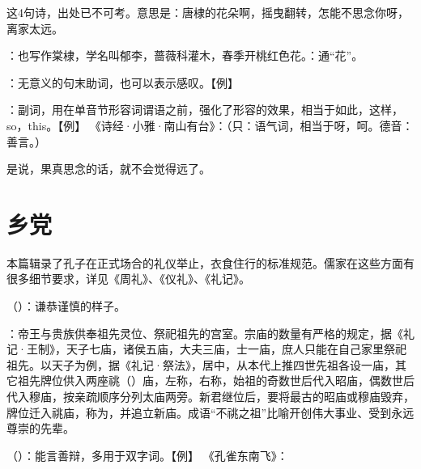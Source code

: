 {
\item {}这4句诗，出处已不可考。意思是：唐棣的花朵啊，摇曳翻转，怎能不思念你呀，离家太远。

：也写作棠棣，学名叫郁李，蔷薇科灌木，春季开桃红色花。：通“花”。

：无意义的句末助词，也可以表示感叹。【例】 

：副词，用在单音节形容词谓语之前，强化了形容的效果，相当于如此，这样，so，this。【例】 《诗经·小雅·南山有台》：（只：语气词，相当于呀，呵。德音：善言。）

\item {}是说，果真思念的话，就不会觉得远了。
}
{}



\chapter{乡党}

本篇辑录了孔子在正式场合的礼仪举止，衣食住行的标准规范。儒家在这些方面有很多细节要求，详见《周礼》、《仪礼》、《礼记》。%

\bigskip

{
\item {}（）：谦恭谨慎的样子。
\item {}：帝王与贵族供奉祖先灵位、祭祀祖先的宫室。宗庙的数量有严格的规定，据《礼记·王制》，天子七庙，诸侯五庙，大夫三庙，士一庙，庶人只能在自己家里祭祀祖先。以天子为例，据《礼记·祭法》，居中，从本代上推四世先祖各设一庙，其它祖先牌位供入两座祧（）庙，左称，右称，始祖的奇数世后代入昭庙，偶数世后代入穆庙，按亲疏顺序分列太庙两旁。新君继位后，要将最古的昭庙或穆庙毁弃，牌位迁入祧庙，称为，并追立新庙。成语“不祧之祖”比喻开创伟大事业、受到永远尊崇的先辈。 %
\item {}（）：能言善辩，多用于双字词。【例】 《孔雀东南飞》：
}
{}


